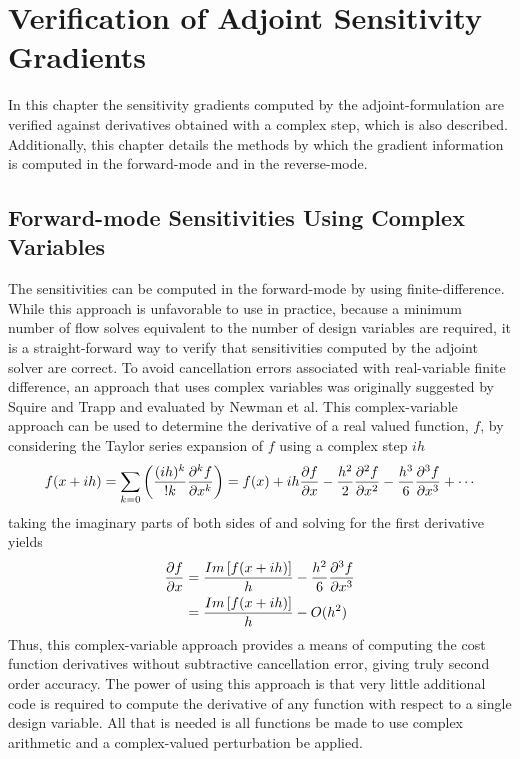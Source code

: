 \chapter{Verification of Adjoint Sensitivity Gradients}
\label{chapter-seven}

In this chapter the sensitivity gradients computed by the adjoint-formulation
are verified against derivatives obtained with a complex step, which is also
described.  Additionally, this chapter details the methods by which the gradient
information is computed in the forward-mode and in the reverse-mode.

\section{Forward-mode Sensitivities Using Complex Vari\-ables}

The sensitivities can be computed in the forward-mode by using
finite-difference.  While this approach is unfavorable to use in practice,
because a minimum number of flow solves equivalent to the number of design
variables are required, it is a straight-forward way to verify that
sensitivities computed by the adjoint solver are correct.  To avoid cancellation
errors associated with real-variable finite difference, an approach that uses
complex variables was originally suggested by Squire and Trapp\cite{squire1998}
and evaluated by Newman et al\cite{newman1998}.  This complex-variable approach
can be used to determine the derivative of a real valued function, $f$, by
considering the Taylor series expansion of $f$ using a complex step $ih$
\begin{equation}
  f(x + ih) = \sum_{k=0}\left( \frac{(ih)^k}{!k}\pnd{f}{x}{k} \right)
            = f(x) + ih\pd{f}{x} - \frac{h^2}{2}\pnd{f}{x}{2}
            - \frac{h^3}{6}\pnd{f}{x}{3} + \cdots
  \label{taylor-exp}
\end{equation}
taking the imaginary parts of both sides of  and solving for
the first derivative yields
\begin{equation}
  \begin{aligned}
    \frac{\partial f}{\partial x} &= \frac{Im\left[ f(x + ih) \right]}{h} -
    \frac{h^2}{6}\frac{\partial^{3} f}{\partial x^{3}} \\
              &= \frac{Im\left[ f(x + ih) \right]}{h} - O(h^2)
  \end{aligned}
  \label{complex-fd}
\end{equation}
Thus, this complex-variable approach provides a means of computing the cost
function derivatives without subtractive cancellation error, giving truly second
order accuracy.  The power of using this approach is that very little additional
code is required to compute the derivative of any function with respect to a
single design variable.  All that is needed is all functions be made to use
complex arithmetic and a complex-valued perturbation be applied.

